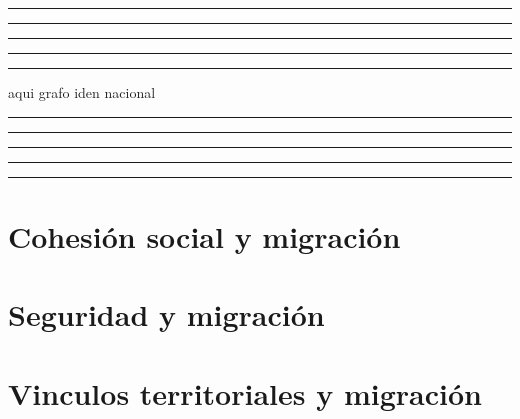 \documentclass[
  spanish,
  letterpaper,
  DIV=11,
  numbers=noendperiod,
  oneside]{scrartcl}
\begin{document}
\begin{center}\rule{0.5\linewidth}{0.5pt}\end{center}

\begin{center}\rule{0.5\linewidth}{0.5pt}\end{center}

\begin{center}\rule{0.5\linewidth}{0.5pt}\end{center}

\begin{center}\rule{0.5\linewidth}{0.5pt}\end{center}

\begin{center}\rule{0.5\linewidth}{0.5pt}\end{center}

aqui grafo iden nacional

\begin{center}\rule{0.5\linewidth}{0.5pt}\end{center}

\begin{center}\rule{0.5\linewidth}{0.5pt}\end{center}

\begin{center}\rule{0.5\linewidth}{0.5pt}\end{center}

\begin{center}\rule{0.5\linewidth}{0.5pt}\end{center}

\begin{center}\rule{0.5\linewidth}{0.5pt}\end{center}

\section{Cohesión social y
migración}\label{cohesiuxf3n-social-y-migraciuxf3n-1}

\section{Seguridad y migración}\label{seguridad-y-migraciuxf3n}

\section{Vinculos territoriales y
migración}\label{vinculos-territoriales-y-migraciuxf3n}
\end{document}
